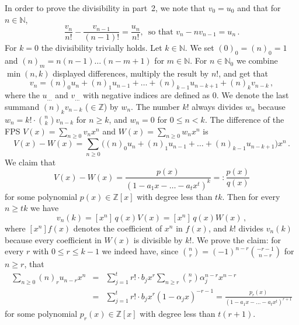 \documentclass[10pt]{article}
\def\N{\mathbb{N}}
\def\Z{\mathbb{Z}}
\def\ds{\dots}
\def\al{\alpha}
\begin{document}
In order to prove the  divisibility in part~2, we note that $v_0=u_0$ and that for $n\in\N$,
$$
{\textstyle
\frac{v_n}{n!}-\frac{v_{n-1}}{(n-1)!}=
\frac{u_n}{n!},\,\text{ so that $v_n-nv_{n-1}=u_n$}\,.
}
$$
For $k=0$ the divisibility trivially holds. Let $k\in\N$. We 
set $(0)_0=(n)_0=1$ and $(n)_m=n(n-1)\ds(n-m+1)$ for $m\in\N$. For $n\in\N_0$ we 
combine $\min(n,k)$ displayed differences, multiply the result by $n!$, and get that
$${\textstyle
v_n=(n)_0u_n+(n)_1u_{n-1}+\ds+(n)_{k-1}u_{n-k+1}+(n)_kv_{n-k}}\,,
$$
where the $u_{\ds}$ and $v_{\ds}$ with negative indices are defined as 
$0$. We denote the last summand $(n)_kv_{n-k}$ ($\in\Z$) by $w_n$. The number $k!$ always divides $w_n$ because 
$w_n=k!\cdot\binom{n}{k}v_{n-k}$ for $n\ge k$, and $w_n=0$ for $0\le n<k$. The difference of the FPS 
$V(x)=\sum_{n\ge0}v_nx^n$ and $W(x)=\sum_{n\ge0}w_nx^n$ is
$${\textstyle
V(x)-W(x)=\sum_{n\ge0}\big((n)_0u_n+(n)_1u_{n-1}+\ds+(n)_{k-1}u_{n-k+1}\big)x^n\,.
}
$$
We claim that
$$
{\textstyle
V(x)-W(x)=\frac{p(x)}{(1-a_1x-\ds-a_tx^t)^k}=:\frac{p(x)}{q(x)}
}
$$
for some polynomial $p(x)\in\Z[x]$ with degree less than $tk$. Then for 
every $n\ge tk$ we have
$$
v_n(k)=[x^n]\,q(x)V(x)=[x^n]\,q(x)W(x)\,,
$$
where $[x^n]f(x)$ denotes the coefficient of $x^n$ in $f(x)$, 
and $k!$ divides $v_n(k)$ because every coefficient in $W(x)$ is divisible by $k!$. We prove the claim: for every $r$
with $0\le r\le k-1$ we indeed have,
since $\binom{n}{r}=(-1)^{n-r}\binom{-r-1}{n-r}$ for $n\ge r$, that
\begin{eqnarray*}
{\textstyle\sum_{n\ge0}(n)_ru_{n-r}x^n}&=&{\textstyle
\sum_{j=1}^t 
r!\cdot b_jx^r\sum_{n\ge r}
\binom{n}{r}\al_j^{n-r}x^{n-r}}\\
&=&{\textstyle
\sum_{j=1}^t r!\cdot b_jx^r
(1-\al_j x)^{-r-1}=
\frac{p_r(x)}{(1-a_1x-\ds-a_tx^t)^{r+1}}
}
\end{eqnarray*}
for some polynomial $p_r(x)\in\Z[x]$ with degree less than $t(r+1)$.
\end{document}
